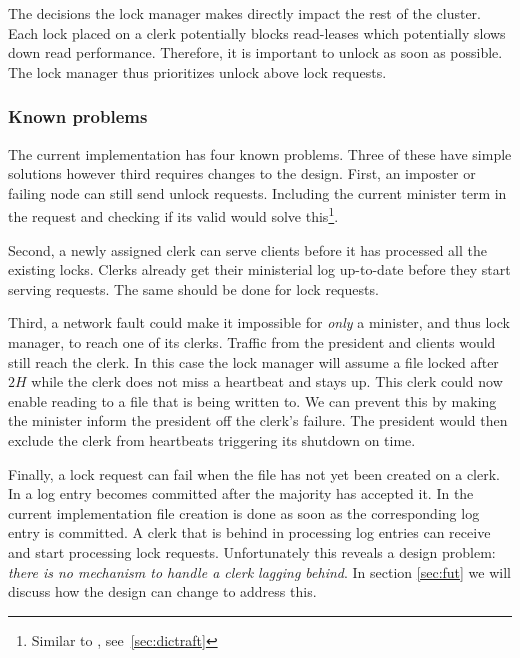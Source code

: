 The decisions the lock manager makes directly impact the rest of the cluster. Each lock placed on a clerk potentially blocks read-leases which potentially slows down read performance. Therefore, it is important to unlock as soon as possible. The lock manager thus prioritizes unlock above lock requests.
%
\subsubsection*{Known problems}
The current implementation has four known problems. Three of these have simple solutions however third requires changes to the design. First, an imposter or failing node can still send unlock requests. Including the current minister term in the request and checking if its valid would solve this\footnote{Similar to \graft{}, see~\cref{sec:dictraft}}. 

Second, a newly assigned clerk can serve clients before it has processed all the existing locks. Clerks already get their ministerial \raft{} log up-to-date before they start serving requests. The same should be done for lock requests. 

Third, a network fault could make it impossible for \textit{only} a minister, and thus lock manager, to reach one of its clerks. Traffic from the president and clients would still reach the clerk. In this case the lock manager will assume a file locked after $2H$ while the clerk does not miss a heartbeat and stays up. This clerk could now enable reading to a file that is being written to. We can prevent this by making the minister inform the president off the clerk's failure. The president would then exclude the clerk from heartbeats triggering its shutdown on time. 

Finally, a lock request can fail when the file has not yet been created on a clerk. In \raft{} a log entry becomes committed after the majority has accepted it. In the current implementation file creation is done as soon as the corresponding log entry is committed. A clerk that is behind in processing log entries can receive and start processing lock requests. Unfortunately this reveals a design problem: \textit{there is no mechanism to handle a clerk lagging behind}. In section \cref{sec:fut} we will discuss how the design can change to address this.
